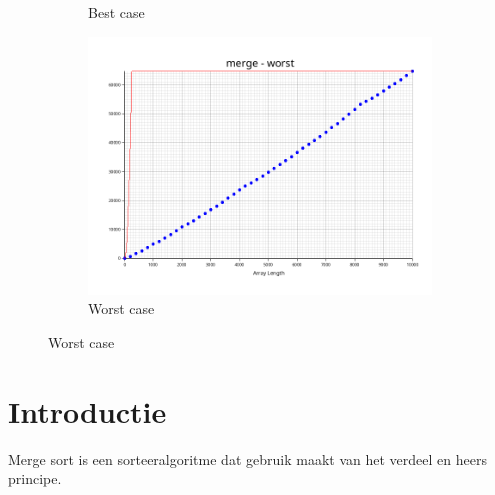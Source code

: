 \documentclass[a4paper]{article}
\begin{document}
\begin{figure}[h]
\begin{subfigure}[b]{0.3\textwidth}
    \caption{Best case}
    \label{fig:merge-best}
  \end{subfigure}
  \begin{subfigure}[b]{0.3\textwidth}
    \includegraphics[width=\textwidth]{../plots/merge-worst.png}
    \caption{Worst case}
    \label{fig:merge-worst}
  \end{subfigure}
\end{figure}

\section{Introductie}
Merge sort is een sorteeralgoritme dat gebruik maakt van het verdeel en heers principe.
\end{document}
